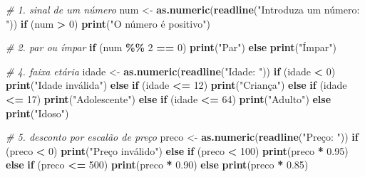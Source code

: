 \documentclass[
  portuguese,
  11pt,
  openany]{book}
\newenvironment{Shaded}{\begin{snugshade}}{\end{snugshade}}
\newcommand{\CommentTok}[1]{\textcolor[rgb]{0.56,0.35,0.01}{\textit{#1}}}
\newcommand{\ControlFlowTok}[1]{\textcolor[rgb]{0.13,0.29,0.53}{\textbf{#1}}}
\newcommand{\DecValTok}[1]{\textcolor[rgb]{0.00,0.00,0.81}{#1}}
\newcommand{\FloatTok}[1]{\textcolor[rgb]{0.00,0.00,0.81}{#1}}
\newcommand{\FunctionTok}[1]{\textcolor[rgb]{0.13,0.29,0.53}{\textbf{#1}}}
\newcommand{\NormalTok}[1]{#1}
\newcommand{\OtherTok}[1]{\textcolor[rgb]{0.56,0.35,0.01}{#1}}
\newcommand{\SpecialCharTok}[1]{\textcolor[rgb]{0.81,0.36,0.00}{\textbf{#1}}}
\newcommand{\StringTok}[1]{\textcolor[rgb]{0.31,0.60,0.02}{#1}}
\begin{document}
\begin{Shaded}
\begin{Highlighting}[]
\CommentTok{\# 1. sinal de um número}
\NormalTok{num }\OtherTok{\textless{}{-}} \FunctionTok{as.numeric}\NormalTok{(}\FunctionTok{readline}\NormalTok{(}\StringTok{"Introduza um número: "}\NormalTok{))}
\ControlFlowTok{if}\NormalTok{ (num }\SpecialCharTok{\textgreater{}} \DecValTok{0}\NormalTok{) }\FunctionTok{print}\NormalTok{(}\StringTok{"O número é positivo"}\NormalTok{)}

\CommentTok{\# 2. par ou ímpar}
\ControlFlowTok{if}\NormalTok{ (num }\SpecialCharTok{\%\%} \DecValTok{2} \SpecialCharTok{==} \DecValTok{0}\NormalTok{) }\FunctionTok{print}\NormalTok{(}\StringTok{"Par"}\NormalTok{) }\ControlFlowTok{else} \FunctionTok{print}\NormalTok{(}\StringTok{"Ímpar"}\NormalTok{)}

\CommentTok{\# 4. faixa etária}
\NormalTok{idade }\OtherTok{\textless{}{-}} \FunctionTok{as.numeric}\NormalTok{(}\FunctionTok{readline}\NormalTok{(}\StringTok{"Idade: "}\NormalTok{))}
\ControlFlowTok{if}\NormalTok{ (idade }\SpecialCharTok{\textless{}} \DecValTok{0}\NormalTok{)               }\FunctionTok{print}\NormalTok{(}\StringTok{"Idade inválida"}\NormalTok{) }\ControlFlowTok{else}
\ControlFlowTok{if}\NormalTok{ (idade }\SpecialCharTok{\textless{}=} \DecValTok{12}\NormalTok{)             }\FunctionTok{print}\NormalTok{(}\StringTok{"Criança"}\NormalTok{)        }\ControlFlowTok{else}
\ControlFlowTok{if}\NormalTok{ (idade }\SpecialCharTok{\textless{}=} \DecValTok{17}\NormalTok{)             }\FunctionTok{print}\NormalTok{(}\StringTok{"Adolescente"}\NormalTok{)    }\ControlFlowTok{else}
\ControlFlowTok{if}\NormalTok{ (idade }\SpecialCharTok{\textless{}=} \DecValTok{64}\NormalTok{)             }\FunctionTok{print}\NormalTok{(}\StringTok{"Adulto"}\NormalTok{)         }\ControlFlowTok{else}
                             \FunctionTok{print}\NormalTok{(}\StringTok{"Idoso"}\NormalTok{)}

\CommentTok{\# 5. desconto por escalão de preço}
\NormalTok{preco }\OtherTok{\textless{}{-}} \FunctionTok{as.numeric}\NormalTok{(}\FunctionTok{readline}\NormalTok{(}\StringTok{"Preço: "}\NormalTok{))}
\ControlFlowTok{if}\NormalTok{ (preco }\SpecialCharTok{\textless{}} \DecValTok{0}\NormalTok{)          }\FunctionTok{print}\NormalTok{(}\StringTok{"Preço inválido"}\NormalTok{) }\ControlFlowTok{else}
\ControlFlowTok{if}\NormalTok{ (preco }\SpecialCharTok{\textless{}} \DecValTok{100}\NormalTok{)        }\FunctionTok{print}\NormalTok{(preco }\SpecialCharTok{*} \FloatTok{0.95}\NormalTok{)     }\ControlFlowTok{else}
\ControlFlowTok{if}\NormalTok{ (preco }\SpecialCharTok{\textless{}=} \DecValTok{500}\NormalTok{)       }\FunctionTok{print}\NormalTok{(preco }\SpecialCharTok{*} \FloatTok{0.90}\NormalTok{)     }\ControlFlowTok{else}
                        \FunctionTok{print}\NormalTok{(preco }\SpecialCharTok{*} \FloatTok{0.85}\NormalTok{)}
\end{Highlighting}
\end{Shaded}
\end{document}
